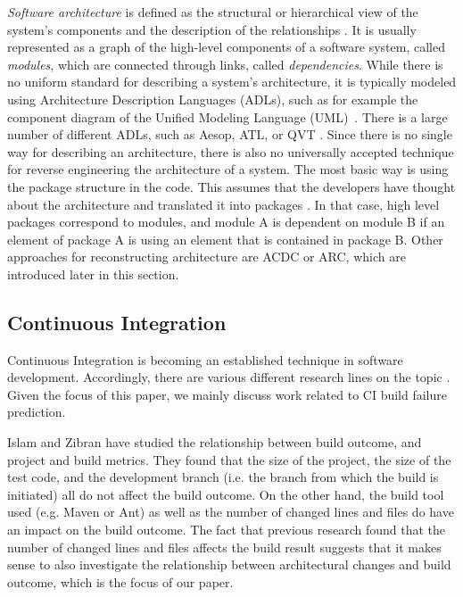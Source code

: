 \documentclass[sigplan, anonymous, review]{acmart}
\begin{document}
\textit{Software architecture} is defined as the structural or hierarchical view of the system's components and the description of the relationships \cite{arcDef}. It is usually represented as a graph of the high-level components of a software system, called \textit{modules}, which are connected through links, called \textit{dependencies}. While there is no uniform standard for describing a system's architecture, it is typically modeled using Architecture Description Languages (ADLs), such as for example the component diagram of the Unified Modeling Language (UML)~\cite{UML-Arch}. There is a large number of different ADLs, such as Aesop, ATL, or QVT \cite{ADLs1, ADLs2}.
Since there is no single way for describing an architecture, there is also no universally accepted technique for reverse engineering the architecture of a system. The most basic way is using the package structure in the code. This assumes that the developers have thought about the architecture and translated it into packages \cite{arcPkg}. In that case, high level packages correspond to modules, and module A is dependent on module B if an element of package A is using an element that is contained in package B. 
Other approaches for reconstructing architecture are ACDC or ARC, which are introduced later in this section.

\subsection{Continuous Integration}

Continuous Integration is becoming an established technique in software development. Accordingly, there are various different research lines on the topic \cite{ci1, ci2, ci3, ci4}. Given the focus of this paper, we mainly discuss work related to CI build failure prediction.

Islam and Zibran \cite{FailsCorr} have studied the relationship between build outcome, and project and build metrics. 
They found that the size of the project, the size of the test code, and the development branch (i.e. the branch from which the build is initiated) all do not affect the build outcome.
On the other hand, the build tool used (e.g. Maven or Ant) as well as the number of changed lines and files do have an impact on the build outcome.
The fact that previous research found that the number of changed lines and files affects the build result suggests that it makes sense to also investigate the relationship between architectural changes and build outcome, which is the focus of our paper.
\end{document}
